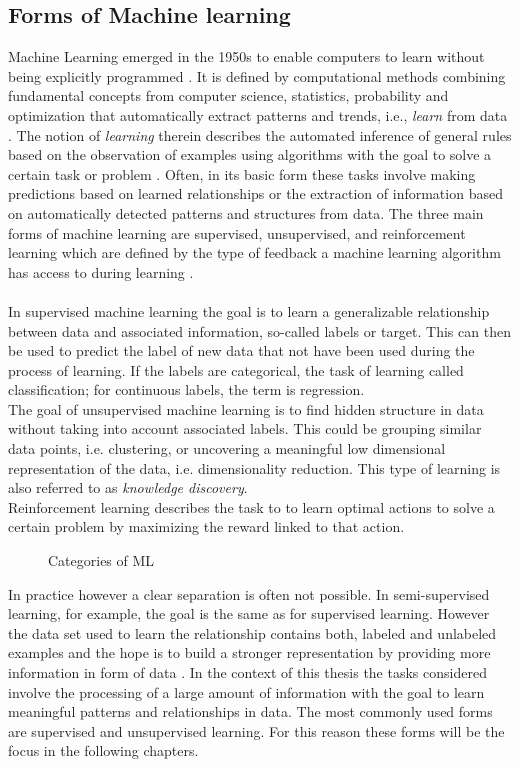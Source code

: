 \subsection{Forms of Machine learning}
Machine Learning emerged in the 1950s to enable computers to learn without being explicitly programmed \cite{Samual1959}. It is defined by computational methods combining fundamental concepts from computer science, statistics, probability and optimization that automatically extract patterns and trends, i.e., \textit{learn} from data \cite{Hastie2009}. The notion of \textit{learning} therein describes the automated inference of general rules based on the observation of examples using algorithms with the goal to solve a certain task or problem \cite{Von_luxburg2011}. Often, in its basic form these tasks involve making predictions based on learned relationships or the extraction of information based on automatically detected patterns and structures from data. The three main forms of machine learning are supervised, unsupervised, and reinforcement learning which are defined by the type of feedback a machine learning algorithm has access to during learning \cite{Shalev2014}.\\
\\
In supervised machine learning the goal is to learn a generalizable relationship between data and associated information, so-called labels or target. This can then be used to predict the label of new data that not have been used during the process of learning. If the labels are categorical, the task of learning called classification; for continuous labels, the term is regression.\\
The goal of unsupervised machine learning is to find hidden structure in data without taking into account associated labels. This could be grouping similar data points, i.e. clustering, or uncovering a meaningful low dimensional representation of the data, i.e. dimensionality reduction. This type of learning is also referred to as \textit{knowledge discovery}\cite{Murphy2012}.\\
Reinforcement learning describes the task to to learn optimal actions to solve a certain problem by maximizing the reward linked to that action.\\
\begin{figure*}[h]
  \caption{Categories of ML}
  \label{fig1:ml_types}
\end{figure*}
In practice however a clear separation is often not possible. In semi-supervised learning, for example, the goal is the same as for supervised learning. However the data set used to learn the relationship contains both, labeled and unlabeled examples and the hope is to build a stronger representation by providing more information in form of data \cite{Burkov2019}. In the context of this thesis the tasks considered involve the processing of a large amount of information with the goal to learn meaningful patterns and relationships in data. The most commonly used forms are supervised and unsupervised learning. For this reason these forms will be the focus in the following chapters. 

